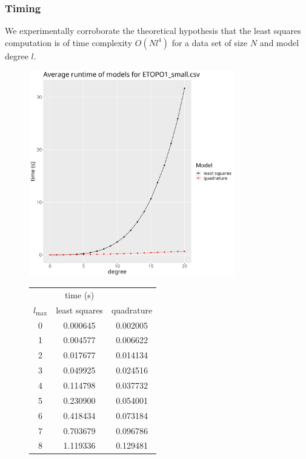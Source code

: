 \documentclass[a4paper]{article}
\theoremstyle{definition}
\begin{document}
\newpage

\subsubsection{Timing}


We experimentally corroborate the theoretical hypothesis that the least squares computation is of time complexity $O(Nl^4)$ for a data set of size $N$ and 
model degree $l$.
\begin{figure}[h!]
\begin{minipage}{0.7\linewidth}
    \centering
    \includegraphics[width=0.8\textwidth]{media/average_runtime.png}
\end{minipage}
\begin{minipage}{0.28\linewidth}
\begin{tabular}{c | c c}
     & time (s) & \\
    $l_{\mathrm{max}}$ & least squares & quadrature \\
    \hline
    0 & 0.000645 & 0.002005 \\
    1 & 0.004577 & 0.006622 \\
    2 & 0.017677 & 0.014134 \\
    3 & 0.049925 & 0.024516 \\
    4 & 0.114798 & 0.037732 \\
    5 & 0.230900 & 0.054001 \\
    6 & 0.418434 & 0.073184 \\
    7 & 0.703679 & 0.096786 \\
    8 & 1.119336 & 0.129481 \\

\end{tabular}
\end{minipage}
\end{figure}
\end{document}
